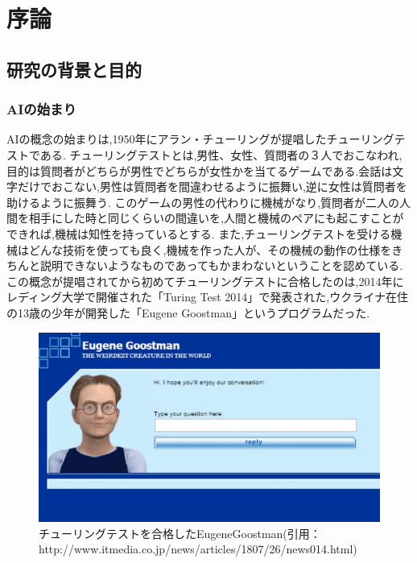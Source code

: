\chapter{序論}
\section{研究の背景と目的}
\subsection{AIの始まり}
AIの概念の始まりは,1950年にアラン・チューリングが提唱したチューリングテストである\cite{ronbun1}.
チューリングテストとは,男性、女性、質問者の３人でおこなわれ,目的は質問者がどちらが男性でどちらが女性かを当てるゲームである.会話は文字だけでおこない,男性は質問者を間違わせるように振舞い,逆に女性は質問者を助けるように振舞う.
このゲームの男性の代わりに機械がなり,質問者が二人の人間を相手にした時と同じくらいの間違いを,人間と機械のペアにも起こすことができれば,機械は知性を持っているとする.
また,チューリングテストを受ける機械はどんな技術を使っても良く,機械を作った人が、その機械の動作の仕様をきちんと説明できないようなものであってもかまわないということを認めている.
この概念が提唱されてから初めてチューリングテストに合格したのは,2014年にレディング大学で開催された「Turing Test 2014」で発表された,ウクライナ在住の13歳の少年が開発した「Eugene Goostman」というプログラムだった.
\begin{figure}[!ht]
    \begin{screen}
    \begin{center}
        \includegraphics[scale=0.6, clip]{./img/Eugene_Goostman.jpg}
        \caption{チューリングテストを合格したEugeneGoostman\newline(引用：http://www.itmedia.co.jp/news/articles/1807/26/news014.html)}
        \label{fig:チューリングテストを合格したEugeneGoostman}
    \end{center}
\end{screen}
\end{figure}
